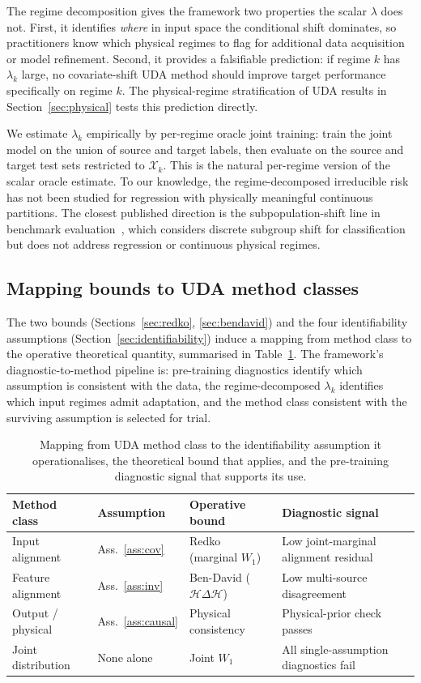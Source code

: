 \documentclass{article}
\begin{document}
The regime decomposition gives the framework two properties the scalar
$\lambda$ does not. First, it identifies \emph{where} in input space
the conditional shift dominates, so practitioners know which physical
regimes to flag for additional data acquisition or model refinement.
Second, it provides a falsifiable prediction: if regime $k$ has
$\lambda_k$ large, no covariate-shift UDA method should improve target
performance specifically on regime $k$. The physical-regime
stratification of UDA results in Section~\ref{sec:physical} tests this
prediction directly.

We estimate $\lambda_k$ empirically by per-regime oracle joint
training: train the joint model on the union of source and target
labels, then evaluate on the source and target test sets restricted to
$\mathcal{X}_k$. This is the natural per-regime version of the scalar
oracle estimate. To our knowledge, the regime-decomposed irreducible
risk has not been studied for regression with physically meaningful
continuous partitions. The closest published direction is the
subpopulation-shift line in benchmark
evaluation~\citep{koh2021wilds}, which considers discrete subgroup
shift for classification but does not address regression or continuous
physical regimes.

\subsection{Mapping bounds to UDA method classes}
\label{sec:mapping}

The two bounds (Sections~\ref{sec:redko}, \ref{sec:bendavid}) and the
four identifiability assumptions (Section~\ref{sec:identifiability})
induce a mapping from method class to the operative theoretical
quantity, summarised in Table~\ref{tab:mapping}. The framework's
diagnostic-to-method pipeline is: pre-training diagnostics identify
which assumption is consistent with the data, the regime-decomposed
$\lambda_k$ identifies which input regimes admit adaptation, and the
method class consistent with the surviving assumption is selected for
trial.

\begin{table}[h]
\centering
\begin{tabular}{llll}
\toprule
Method class & Assumption & Operative bound & Diagnostic signal \\
\midrule
Input alignment & Ass.~\ref{ass:cov} & Redko (marginal $W_1$)
& Low joint-marginal alignment residual \\
Feature alignment & Ass.~\ref{ass:inv} & Ben-David ($\mathcal{H}\Delta\mathcal{H}$)
& Low multi-source disagreement \\
Output / physical & Ass.~\ref{ass:causal} & Physical consistency
& Physical-prior check passes \\
Joint distribution & None alone & Joint $W_1$
& All single-assumption diagnostics fail \\
\bottomrule
\end{tabular}
\caption{Mapping from UDA method class to the identifiability assumption
it operationalises, the theoretical bound that applies, and the
pre-training diagnostic signal that supports its use.}
\label{tab:mapping}
\end{table}
\end{document}
